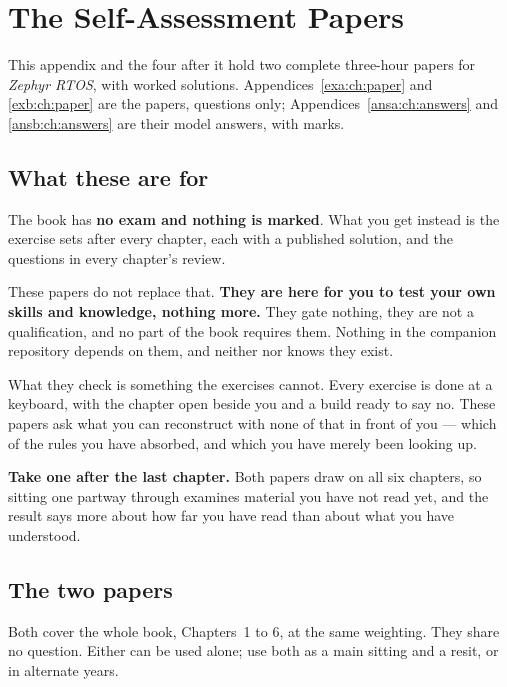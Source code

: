 
\chapter{The Self-Assessment Papers}
\label{exam:ch:about}

This appendix and the four after it hold two complete three-hour papers for \emph{Zephyr RTOS},
with worked solutions. Appendices~\ref{exa:ch:paper} and \ref{exb:ch:paper} are the papers,
questions only; Appendices~\ref{ansa:ch:answers} and \ref{ansb:ch:answers} are their model answers,
with marks.

\section*{What these are for}
The book has \textbf{no exam and nothing is marked}. What you get instead is the exercise sets after
every chapter, each with a published solution, and the questions in every chapter's review.

These papers do not replace that. \textbf{They are here for you to test your own skills and
knowledge, nothing more.} They gate nothing, they are not a qualification, and no part of the book
requires them. Nothing in the companion repository depends on them, and neither 
nor  knows they exist.

What they check is something the exercises cannot. Every exercise is done at a keyboard, with the
chapter open beside you and a build ready to say no. These papers ask what you can reconstruct with
none of that in front of you --- which of the rules you have absorbed, and which you have merely
been looking up.

\textbf{Take one after the last chapter.} Both papers draw on all six chapters, so sitting one
partway through examines material you have not read yet, and the result says more about how far you
have read than about what you have understood.

\section*{The two papers}
Both cover the whole book, Chapters~1 to 6, at the same weighting. They share no question. Either
can be used alone; use both as a main sitting and a resit, or in alternate years.

